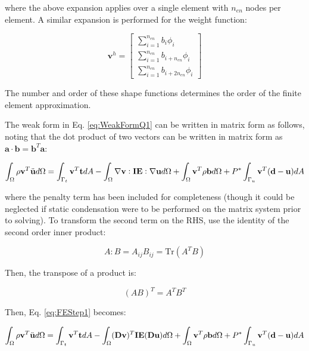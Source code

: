\documentclass[10pt]{article}
\begin{document}
where the above expansion applies over a single element with \(n_{en}\) nodes per element. A similar expansion is performed for the weight function:

\begin{equation}
\textbf{v}^h=\begin{bmatrix}\sum_{i=1}^{n_{en}}b_i\phi_i\\\sum_{i=1}^{n_{en}}b_{i+n_{en}}\phi_i\\\sum_{i=1}^{n_{en}}b_{i+2n_{en}}\phi_i\end{bmatrix}
\end{equation}

The number and order of these shape functions determines the order of the finite element approximation. 

The weak form in Eq. \eqref{eq:WeakFormQ1} can be written in matrix form as follows, noting that the dot product of two vectors can be written in matrix form as \(\textbf{a}\cdot\textbf{b}=\textbf{b}^T\textbf{a}\):

\begin{equation}
\label{eq:FEStep1}
\int_{\Omega}\rho\textbf{v}^T\ddot{\textbf{u}}d\Omega=\int_{\Gamma_t}\textbf{v}^T\textbf{t}dA- \int_{\Omega}\nabla\textbf{v}:\textbf{IE}:\nabla\textbf{u}d\Omega +\int_{\Omega}\textbf{v}^T\rho\textbf{b}d\Omega+P^{*}\int_{\Gamma_u}\textbf{v}^T(\textbf{d}-\textbf{u})dA\\
\end{equation}

where the penalty term has been included for completeness (though it could be neglected if static condensation were to be performed on the matrix system prior to solving). To transform the second term on the RHS, use the identity of the second order inner product:

\begin{equation}
A:B=A_{ij}B_{ij}=\text{Tr}(A^TB)
\end{equation}

Then, the transpose of a product is:

\begin{equation}
(AB)^T=A^TB^T
\end{equation}


Then, Eq. \eqref{eq:FEStep1} becomes:

\begin{equation}
\int_{\Omega}\rho\textbf{v}^T\ddot{\textbf{u}}d\Omega=\int_{\Gamma_t}\textbf{v}^T\textbf{t}dA- \int_{\Omega}(\textbf{D}\textbf{v})^T\textbf{IE}(\textbf{D}\textbf{u})d\Omega +\int_{\Omega}\textbf{v}^T\rho\textbf{b}d\Omega+P^{*}\int_{\Gamma_u}\textbf{v}^T(\textbf{d}-\textbf{u})dA\\
\end{equation}
\end{document}

